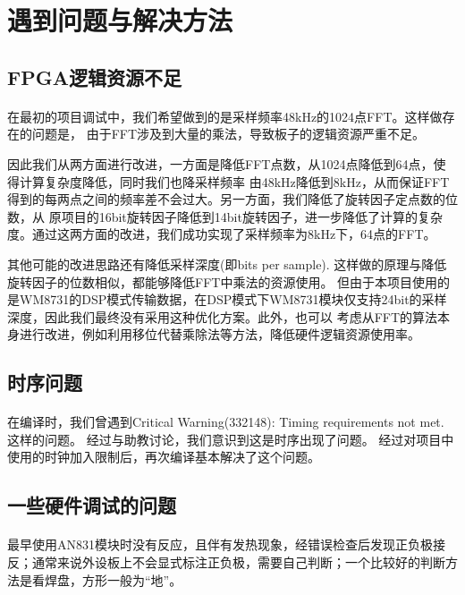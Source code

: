 \documentclass[12pt]{article}
\begin{document}
\section{遇到问题与解决方法}
\subsection{FPGA逻辑资源不足}
\paragraph{}在最初的项目调试中，我们希望做到的是采样频率48kHz的1024点FFT。这样做存在的问题是，
由于FFT涉及到大量的乘法，导致板子的逻辑资源严重不足。

因此我们从两方面进行改进，一方面是降低FFT点数，从1024点降低到64点，使得计算复杂度降低，同时我们也降采样频率
由48kHz降低到8kHz，从而保证FFT得到的每两点之间的频率差不会过大。另一方面，我们降低了旋转因子定点数的位数，从
原项目的16bit旋转因子降低到14bit旋转因子，进一步降低了计算的复杂度。通过这两方面的改进，我们成功实现了采样频率为8kHz下，64点的FFT。

其他可能的改进思路还有降低采样深度(即bits per sample). 这样做的原理与降低旋转因子的位数相似，都能够降低FFT中乘法的资源使用。
但由于本项目使用的是WM8731的DSP模式传输数据，在DSP模式下WM8731模块仅支持24bit的采样深度，因此我们最终没有采用这种优化方案。此外，也可以
考虑从FFT的算法本身进行改进，例如利用移位代替乘除法等方法，降低硬件逻辑资源使用率。

\subsection{时序问题}
\paragraph{}在编译时，我们曾遇到Critical Warning(332148): Timing requirements not met. 这样的问题。
经过与助教讨论，我们意识到这是时序出现了问题。
经过对项目中使用的时钟加入限制后，再次编译基本解决了这个问题。

\subsection{一些硬件调试的问题}
\paragraph{}最早使用AN831模块时没有反应，且伴有发热现象，经错误检查后发现正负极接反；通常来说外设板上不会显式标注正负极，需要自己判断；一个比较好的判断方法是看焊盘，方形一般为“地”。
\end{document}
